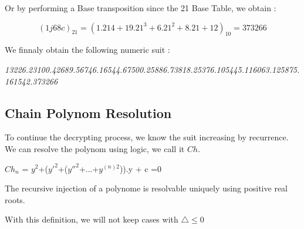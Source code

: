\documentclass[letterpaper,10pt,english]{sphinxmanual}
\begin{document}
\begin{flushleft}
  Or by performing a Base transposition since the 21 Base Table, we obtain :
\end{flushleft}
\begin{equation}
(1j68c)_{21}=(1.21{4}+19.21^{3}+6.21^{2}+8.21+12)_{10}=373266
\end{equation}

\begin{center}
  We finnaly obtain the following numeric suit :
  
\textit{13226.23100.42689.56746.16544.67500.25886.73818.25376.105445.116063.125875.161542.373266}
\end{center}

\subsection{Chain Polynom Resolution}

To continue the decrypting process, we know the suit increasing by recurrence.
We can resolve the polynom using logic, we call it $Ch$.

\begin{center}
  $Ch_{n}$ = $y^{2}$+($y'^{2}$+($y''^{2}$+...+$y^{(n)2}$)).y + c =0
\end{center}
The recursive injection of a polynome is resolvable uniquely using positive real roots.

With this definition, we will not keep cases with $\triangle \leq 0 $ 
\end{document}
